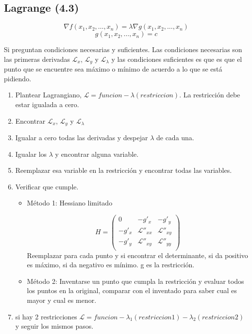 \subsection{Lagrange (4.3)}

$$\nabla f(x_1,x_2,\dots,x_n)=\lambda \nabla g(x_1,x_2,\dots,x_n)$$
$$g(x_1,x_2,\dots,x_n)=c$$

Si preguntan condiciones necesarias y suficientes. Las condiciones necesarias son las primeras derivadas $\mathcal{L}_x$, $\mathcal{L}_y$ y $\mathcal{L}_\lambda$ y las condiciones suficientes es que es que el punto que se encuentre sea máximo o mínimo de acuerdo a lo que se está pidiendo.

\begin{enumerate}
	\item Plantear Lagrangiano, $\mathcal{L}=funcion - \lambda(restriccion)$. La restricción debe estar igualada a cero.
	\item Encontrar $\mathcal{L}_x$, $\mathcal{L}_y$ y $\mathcal{L}_\lambda$
	\item Igualar a cero todas las derivadas y despejar $\lambda$ de cada una.
	\item Igualar los $\lambda$ y encontrar alguna variable.
	\item Reemplazar esa variable en la restricción y encontrar todas las variables.
	\item Verificar que cumple.
	\begin{itemize}
		\item Método 1: Hessiano limitado
		
		$$H=\begin{pmatrix}
		0 & -g'_x & -g'_y \\
		-g'_x & \mathcal{L}''_{xx} & \mathcal{L}''_{xy} \\
		-g'_y & \mathcal{L}''_{xy} & \mathcal{L}''_{yy} \\
		\end{pmatrix}$$
		Reemplazar para cada punto y si encontrar el determinante, si da positivo es máximo, si da negativo es mínimo. g es la restricción.
		\item Método 2: Inventarse un punto que cumpla la restricción y evaluar todos los puntos en la original, comparar con el inventado para saber cual es mayor y cual es menor.
		
	\end{itemize}
	\item si hay 2 restricciones  $\mathcal{L}=funcion - \lambda_1(restriccion1)-\lambda_2(restriccion2)$ y seguir los mismos pasos.
\end{enumerate}

